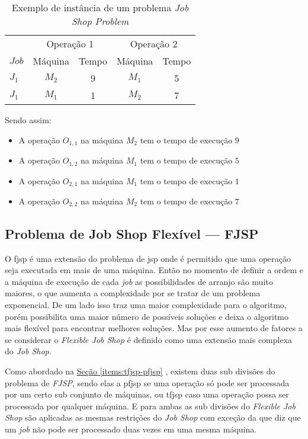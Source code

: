 \begin{table}[htb]
    \centering
    \caption{Exemplo de instância de um problema \textit{Job Shop Problem}}
    \label{fig:ex-instancia-problema-JSP}
    \begin{tabular}[t]{lcccc}
        \hline
        &\multicolumn{2}{c}{Operação 1}&\multicolumn{2}{c}{Operação 2}\\
        $Job$&Máquina&Tempo&Máquina&Tempo\\
        \hline
        $J_1$&$M_2$&9&$M_1$&5\\
        $J_1$&$M_1$&1&$M_2$&7\\
        \hline
    \end{tabular}
\end{table}

\noindent Sendo assim:\hfill
\begin{itemize}
    \item A operação $O_{1,1}$ na máquina $M_2$ tem o tempo de execução $9$
    \item A operação $O_{1,2}$ na máquina $M_1$ tem o tempo de execução $5$
    \item A operação $O_{2,1}$ na máquina $M_1$ tem o tempo de execução $1$
    \item A operação $O_{2,2}$ na máquina $M_2$ tem o tempo de execução $7$
\end{itemize}


\subsection{Problema de Job Shop Flexível — FJSP}
O \gls{fjsp} é uma extensão do problema de \gls{jsp} onde é permitido que uma operação seja executada em mais de uma máquina. Então no momento de definir a ordem e a máquina de execução de cada \textit{job} as possibilidades de arranjo são muito maiores, o que aumenta a complexidade por se tratar de um problema exponencial.
De um lado isso traz uma maior complexidade para o algoritmo, porém possibilita uma maior número de possíveis soluções e deixa o algoritmo mais flexível para encontrar melhores soluções. Mas por esse aumento de fatores a se considerar o \textit{Flexible Job Shop} é definido como uma extensão mais complexa do \textit{Job Shop}.


\indent Como abordado na
\hyperref[items:tfjsp-pfjsp]{Seção \ref{items:tfjsp-pfjsp}}
, existem duas sub divisões do problema de \textit{FJSP}, sendo elas a \gls{pfjsp} se uma operação só pode ser processada por um certo sub conjunto de máquinas, ou \gls{tfjsp} caso uma operação possa ser processada por qualquer máquina.
E para ambas as sub divisões do \textit{Flexible Job Shop} são aplicadas as mesmas restrições do \textit{Job Shop} com exceção da que diz que um \textit{job} não pode ser processado duas vezes em uma mesma máquina.


